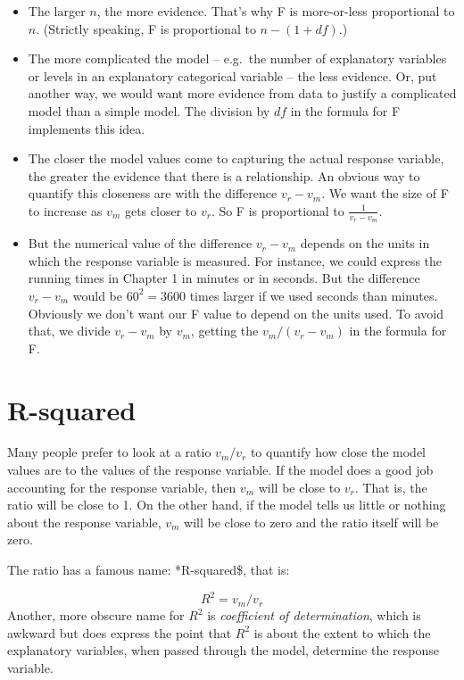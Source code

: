 \documentclass[]{book}
\providecommand{\tightlist}{%
  \setlength{\itemsep}{0pt}\setlength{\parskip}{0pt}}
\begin{document}
\begin{itemize}
\tightlist
\item
  The larger \(n\), the more evidence. That's why F is more-or-less proportional to \(n\). (Strictly speaking, F is proportional to \(n - (1+df)\).)
\item
  The more complicated the model -- e.g.~the number of explanatory variables or levels in an explanatory categorical variable -- the less evidence. Or, put another way, we would want more evidence from data to justify a complicated model than a simple model. The division by \(df\) in the formula for F implements this idea.
\item
  The closer the model values come to capturing the actual response variable, the greater the evidence that there is a relationship. An obvious
  way to quantify this closeness are with the difference \(v_r - v_m\). We want the size of F to increase as \(v_m\) gets closer to \(v_r\). So F is proportional to \(\frac{1}{v_r - v_m}\).
\item
  But the numerical value of the difference \(v_r - v_m\) depends on the units in which the response variable is measured. For instance, we could express the running times in Chapter 1 in minutes or in seconds. But the difference \(v_r - v_m\) would be \(60^2 = 3600\) times larger if we used seconds than minutes. Obviously we don't want our F value to depend on the units used. To avoid that, we divide \(v_r - v_m\) by \(v_m\), getting the \(v_m / (v_r - v_m)\) in the formula for F.
\end{itemize}

\hypertarget{r-squared}{%
\section{R-squared}\label{r-squared}}

Many people prefer to look at a ratio \(v_m / v_r\) to quantify how close the model values are to the values of the response variable. If the model does a good job accounting for the response variable, then \(v_m\) will be close to \(v_r\). That is, the ratio will be close to 1. On the other hand, if the model tells us little or nothing about the response variable, \(v_m\) will be close to zero and the ratio itself will be zero.

The ratio has a famous name: *R-squared\$, that is:

\[R^2 = v_m / v_r\]
Another, more obscure name for \(R^2\) is \emph{coefficient of determination}, which is awkward but does express the point that \(R^2\) is about the extent to which the explanatory variables, when passed through the model, determine the response variable.
\end{document}
